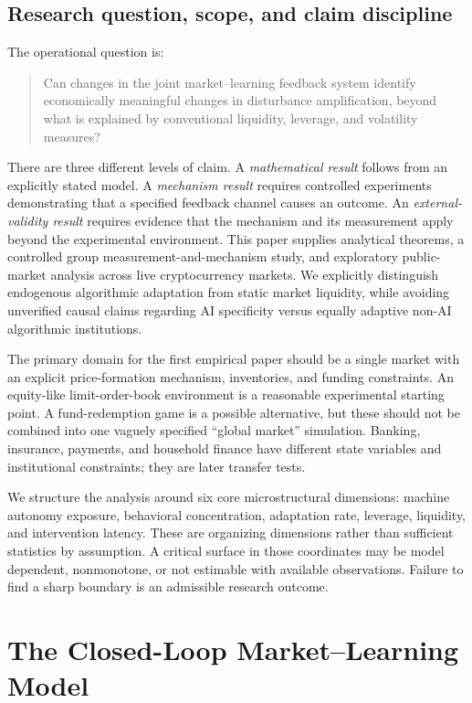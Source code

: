 \documentclass[10pt,twocolumn,letterpaper]{article}
\theoremstyle{definition}
\theoremstyle{remark}
\begin{document}
\subsection{Research question, scope, and claim discipline}
\label{sec:scope}
The operational question is:
\begin{quote}
Can changes in the joint market--learning feedback system identify economically meaningful changes in disturbance amplification, beyond what is explained by conventional liquidity, leverage, and volatility measures?
\end{quote}
There are three different levels of claim. A \emph{mathematical result} follows from an explicitly stated model. A \emph{mechanism result} requires controlled experiments demonstrating that a specified feedback channel causes an outcome. An \emph{external-validity result} requires evidence that the mechanism and its measurement apply beyond the experimental environment. This paper supplies analytical theorems, a controlled group measurement-and-mechanism study, and exploratory public-market analysis across live cryptocurrency markets. We explicitly distinguish endogenous algorithmic adaptation from static market liquidity, while avoiding unverified causal claims regarding AI specificity versus equally adaptive non-AI algorithmic institutions.

The primary domain for the first empirical paper should be a single market with an explicit price-formation mechanism, inventories, and funding constraints. An equity-like limit-order-book environment is a reasonable experimental starting point. A fund-redemption game is a possible alternative, but these should not be combined into one vaguely specified ``global market'' simulation. Banking, insurance, payments, and household finance have different state variables and institutional constraints; they are later transfer tests.

We structure the analysis around six core microstructural dimensions: machine autonomy exposure, behavioral concentration, adaptation rate, leverage, liquidity, and intervention latency. These are organizing dimensions rather than sufficient statistics by assumption. A critical surface in those coordinates may be model dependent, nonmonotone, or not estimable with available observations. Failure to find a sharp boundary is an admissible research outcome.

\section{The Closed-Loop Market--Learning Model}
\label{sec:ch2}
\end{document}
